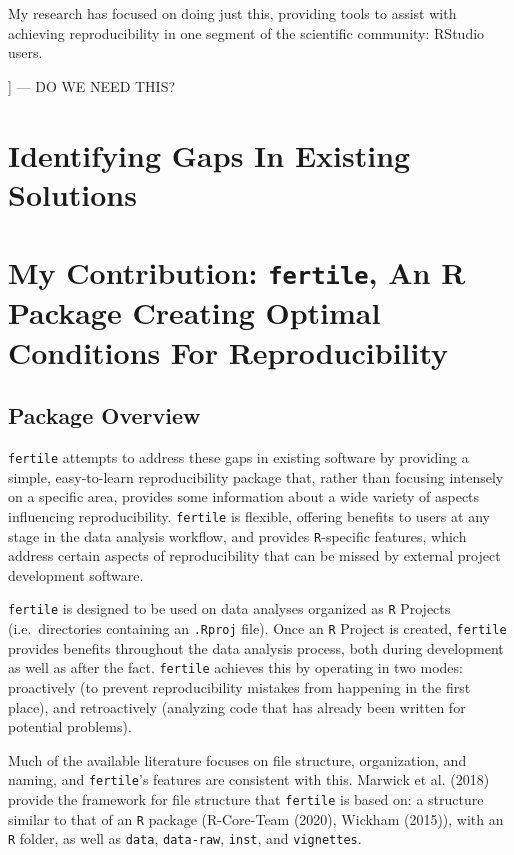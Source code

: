 \documentclass[12pt,twoside]{reedthesis}
\begin{document}
My research has focused on doing just this, providing tools to assist
with achieving reproducibility in one segment of the scientific
community: RStudio users.

{]} --- DO WE NEED THIS?

\section{Identifying Gaps In Existing
Solutions}\label{identifying-gaps-in-existing-solutions}

\section{\texorpdfstring{My Contribution: \texttt{fertile}, An R Package
Creating Optimal Conditions For
Reproducibility}{My Contribution: fertile, An R Package Creating Optimal Conditions For Reproducibility}}\label{my-contribution-fertile-an-r-package-creating-optimal-conditions-for-reproducibility}

\subsection{Package Overview}\label{package-overview}

\texttt{fertile} attempts to address these gaps in existing software by
providing a simple, easy-to-learn reproducibility package that, rather
than focusing intensely on a specific area, provides some information
about a wide variety of aspects influencing reproducibility.
\texttt{fertile} is flexible, offering benefits to users at any stage in
the data analysis workflow, and provides \texttt{R}-specific features,
which address certain aspects of reproducibility that can be missed by
external project development software.

\texttt{fertile} is designed to be used on data analyses organized as
\texttt{R} Projects (i.e.~directories containing an \texttt{.Rproj}
file). Once an \texttt{R} Project is created, \texttt{fertile} provides
benefits throughout the data analysis process, both during development
as well as after the fact. \texttt{fertile} achieves this by operating
in two modes: proactively (to prevent reproducibility mistakes from
happening in the first place), and retroactively (analyzing code that
has already been written for potential problems).

Much of the available literature focuses on file structure,
organization, and naming, and \texttt{fertile}'s features are consistent
with this. Marwick et al. (2018) provide the framework for file
structure that \texttt{fertile} is based on: a structure similar to that
of an \texttt{R} package (R-Core-Team (2020), Wickham (2015)), with an
\texttt{R} folder, as well as \texttt{data}, \texttt{data-raw},
\texttt{inst}, and \texttt{vignettes}.
\end{document}
